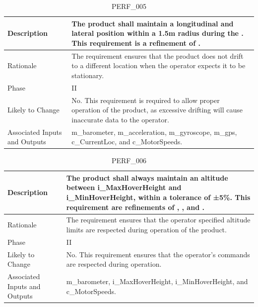 \documentclass{article}
\begin{document}
\begin{table}[!h]
\begin{center}
\caption {PERF\_005} 
\label{PERF_005}
\begin{tabular}{ | m{3cm} | m{11cm} | }
\hline
Description & The product shall maintain a longitudinal and lateral position within a 1.5m radius during the \nameref{Hover State}. This requirement is a refinement of \nameref{STA_001}. \\
\hline
Rationale & The requirement ensures that the product does not drift to a different location when the operator expects it to be stationary. \\
\hline
Phase & II \\
\hline
Likely to Change & No. This requirement is required to allow proper operation of the product, as excessive drifting will cause inaccurate data to the operator. \\
\hline
Associated Inputs and Outputs & m\_barometer, m\_acceleration, m\_gyroscope, m\_gps, c\_CurrentLoc, and c\_MotorSpeeds.  \\
\hline
\end{tabular}
\end{center}
\end{table}

\begin{table}[!h]
\begin{center}
\caption {PERF\_006} 
\label{PERF_006}
\begin{tabular}{ | m{3cm} | m{11cm} | }
\hline
Description & The product shall always maintain an altitude between i\_MaxHoverHeight and i\_MinHoverHeight, within a tolerance of ±5\%. This requirement are refinements of \nameref{STA_001}, \nameref{STA_002}, and \nameref{STA_003}.  \\
\hline
Rationale & The requirement ensures that the operator specified altitude limits are respected during operation of the product. \\
\hline
Phase & II \\
\hline
Likely to Change & No. This requirement ensures that the operator's commands are respected during operation. \\
\hline
Associated Inputs and Outputs & m\_barometer, i\_MaxHoverHeight, i\_MinHoverHeight, and c\_MotorSpeeds.  \\
\hline
\end{tabular}
\end{center}
\end{table}
\end{document}
